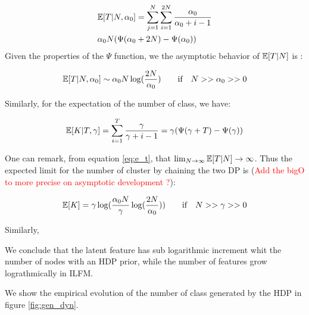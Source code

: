 \begin{align}
&\mathbb{E}[T|N, \alpha_0] = \sum_{j=1}^N\sum_{i=1}^{2N} \frac{\alpha_0}{\alpha_0 +i-1} \\
& \alpha_0 N (\Psi(\alpha_0+2N) - \Psi(\alpha_0))
\end{align}
Given the properties of the $\Psi$ function, we the asymptotic behavior of $\mathbb{E}[T|N]$ is :

\begin{equation*} \label{eq:e_t}
\E[T|N, \alpha_0] \sim \alpha_0 N \log(\frac{2N}{\alpha_0}) \qquad \text{if} \quad N >> \alpha_0 >> 0
\end{equation*}

Similarly, for the expectation of the number of class, we have:

\begin{equation*}
\mathbb{E}[K|T, \gamma] = \sum_{i=1}^{T} \frac{\gamma}{\gamma +i-1} = \gamma (\Psi(\gamma+T) - \Psi(\gamma))
\end{equation*}

One can remark, from equation \eqref{eq:e_t}, that $\lim_{N\to\infty} \mathbb{E}[T|N] \to  \infty$. Thus the expected limit for the number of cluster by chaining the two DP is (\textcolor{red}{Add the bigO to more precise on asymptotic development ?}):

\begin{equation*}
\mathbb{E}[K] = \gamma \log(\frac{\alpha_0 N}{\gamma}\log(\frac{2N}{\alpha_0} )) \qquad \textnormal{if} \quad N >> \gamma>>0
\end{equation*}

Similarly, 

We conclude that the latent feature has sub logarithmic increment whit the number of nodes with an HDP prior, while the number of features grow lograthmically in ILFM.

We show the empirical evolution of the number of class generated by the HDP in figure \ref{fig:gen_dyn}.

